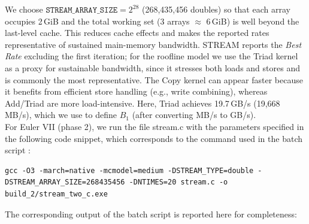 \documentclass[unicode,10pt,a4paper,oneside,numbers=endperiod,openany]{scrartcl}
\begin{document}
We choose $\texttt{STREAM\_ARRAY\_SIZE}=2^{28}$ (268,435,456 doubles) so that each array occupies 2\,GiB and the total working set (3 arrays $\approx$ 6\,GiB) is well beyond the last-level cache. This reduces cache effects and makes the reported rates representative of sustained main-memory bandwidth. STREAM reports the \emph{Best Rate} excluding the first iteration; for the roofline model we use the Triad kernel as a proxy for sustainable bandwidth, since it stresses both loads and stores and is commonly the most representative. The Copy kernel can appear faster because it benefits from efficient store handling (e.g., write combining), whereas Add/Triad are more load-intensive. Here, Triad achieves 19.7\,GB/s (19,668\,MB/s), which we use to define $B_1$ (after converting MB/s to GB/s).\\

For Euler VII (phase 2), we run the file stream.c with the parameters specified in the following code snippet, which corresponds to the command used in the batch script :
\begin{lstlisting}[style=grayverbatim]
gcc -O3 -march=native -mcmodel=medium -DSTREAM_TYPE=double -DSTREAM_ARRAY_SIZE=268435456 -DNTIMES=20 stream.c -o build_2/stream_two_c.exe
\end{lstlisting}
The corresponding output of the batch script is reported here for completeness:
\end{document}
